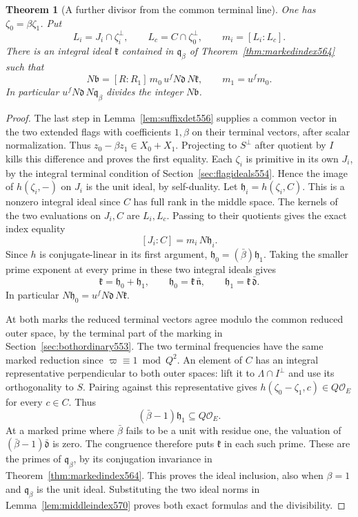 \documentclass[a4paper,11pt]{article}
\newtheorem{theorem}[proposition]{Theorem}
\theoremstyle{definition}
\theoremstyle{remark}
\numberwithin{equation}{section}
\begin{document}
\begin{theorem}[A further divisor from the common terminal line]
\leavevmode\label{thm:middleterminal570}
One has \(\zeta_0=\beta\zeta_1\). Put
\[
   L_i=J_i\cap\zeta_i^\perp,\qquad L_c=C\cap\zeta_0^\perp,
   \qquad m_i=[L_i:L_c].
\]
There is an integral ideal \(\mathfrak k\) contained in
\(\mathfrak q_\beta\) of Theorem~\ref{thm:markedindex564}
such that
\[
  N\mathfrak b
    =[R:R_1]\,m_0\,u^f N\mathfrak d\,N\mathfrak k,
       \qquad m_1=u^f m_0 .
\]
In particular \(u^f N\mathfrak d\,N\mathfrak q_\beta\)
divides the integer \(N\mathfrak b\).
\end{theorem}
\begin{proof}
The last step in Lemma~\ref{lem:suffixdet556} supplies a
common vector in the two extended flags with coefficients
\(1,\beta\) on their terminal vectors, after scalar
normalization. Thus \(z_0-\beta z_1\in X_0+X_1\).
Projecting to \(S^\perp\) after quotient by \(I\) kills
this difference and proves the first equality. Each
\(\zeta_i\) is primitive in its own \(J_i\), by the
integral terminal condition of Section~\ref{sec:flagideals554}.
Hence the image of \(h(\zeta_i,-)\) on \(J_i\) is the unit
ideal, by self-duality. Let
\(\mathfrak h_i=h(\zeta_i,C)\). This is a nonzero integral
ideal since \(C\) has full rank in the middle space.
The kernels of the two evaluations on \(J_i,C\) are
\(L_i,L_c\). Passing to their quotients gives the exact
index equality
\[
                   [J_i:C]=m_i\, N\mathfrak h_i .
\]
Since \(h\) is conjugate-linear in its first argument,
\(\mathfrak h_0=(\bar\beta)\mathfrak h_1\). Taking the
smaller prime exponent at every prime in these two
integral ideals gives
\[
  \mathfrak k=\mathfrak h_0+\mathfrak h_1,\qquad
  \mathfrak h_0=\mathfrak k\,\bar{\mathfrak n},\qquad
  \mathfrak h_1=\mathfrak k\,\bar{\mathfrak d}.
\]
In particular \(N\mathfrak h_0=u^fN\mathfrak d\,N\mathfrak k\).

At both marks the reduced terminal vectors agree modulo the
common reduced outer space, by the terminal part of the
marking in Section~\ref{sec:bothordinary553}. The two terminal
frequencies have the same marked reduction since
\(\varpi\equiv1\bmod Q^2\). An element of \(C\) has an
integral representative perpendicular to both outer spaces:
lift it to \(\Lambda\cap I^\perp\) and use its
orthogonality to \(S\). Pairing against this representative
gives \(h(\zeta_0-\zeta_1,c)\in Q\mathcal O_E\) for every
\(c\in C\). Thus
\[
                (\bar\beta-1)\mathfrak h_1
                               \subseteq Q\mathcal O_E .
\]
At a marked prime where \(\bar\beta\) fails to be a unit
with residue one, the valuation of
\((\bar\beta-1)\bar{\mathfrak d}\) is zero. The congruence
therefore puts \(\mathfrak k\) in each such prime. These
are the primes of \(\mathfrak q_\beta\), by its conjugation
invariance in Theorem~\ref{thm:markedindex564}. This
proves the ideal inclusion, also when \(\beta=1\) and
\(\mathfrak q_\beta\) is the unit ideal. Substituting the
two ideal norms in Lemma~\ref{lem:middleindex570} proves
both exact formulas and the divisibility.
\end{proof}
\end{document}
